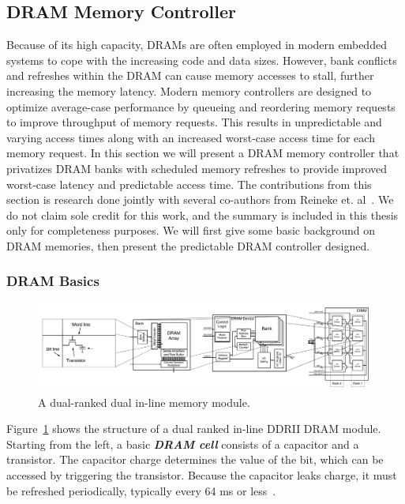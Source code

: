 \subsection{DRAM Memory Controller}
Because of its high capacity, DRAMs are often employed in modern embedded systems to cope with the increasing code and data sizes.  
However, bank conflicts and refreshes within the DRAM can cause memory accesses to stall, further increasing the memory latency. 
Modern memory controllers are designed to optimize average-case performance by queueing and reordering memory requests to improve throughput of memory requests. 
This results in unpredictable and varying access times along with an increased worst-case access time for each memory request.
In this section we will present a DRAM memory controller that privatizes DRAM banks with scheduled memory refreshes to provide improved worst-case latency and predictable access time.    
The contributions from this section is research done jointly with several co-authors from Reineke et. al~\cite{ReinekeLiuPatelKimLee11_PRETDRAMControllerBankPrivatizationForPredictability}. 
We do not claim sole credit for this work, and the summary is included in this thesis only for completeness purposes. 
We will first give some basic background on DRAM memories, then present the predictable DRAM controller designed.

\subsubsection{DRAM Basics}

\begin{figure}[h]
\begin{center}
\vspace{-8mm}
\includegraphics[width=\textwidth]{figs/dram-overview.pdf}
\vspace{-8mm}
\caption{A dual-ranked dual in-line memory module.}\label{fig:dram_basics}
\vspace{-5mm}
\end{center}
\end{figure} 

Figure~\ref{fig:dram_basics} shows the structure of a dual ranked in-line DDRII DRAM module.
Starting from the left, a basic \textbf{\emph{DRAM cell}} consists of a capacitor and a transistor. 
The capacitor charge determines the value of the bit, which can be accessed by triggering the transistor. 
Because the capacitor leaks charge, it must be refreshed periodically, typically every 64 ms or less~\cite{jedec}.

